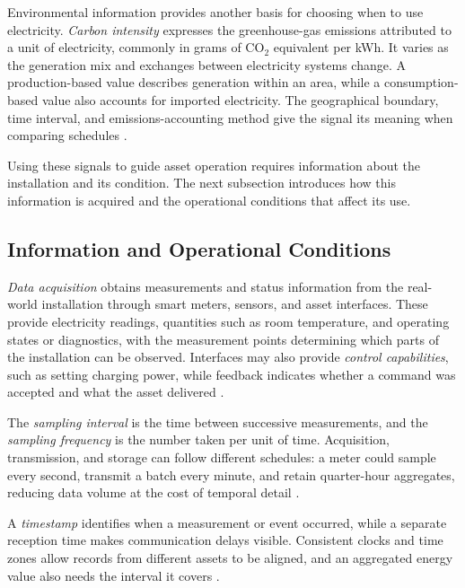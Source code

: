 Environmental information provides another basis for choosing when to use electricity. \emph{Carbon intensity} expresses the greenhouse-gas emissions attributed to a unit of electricity, commonly in grams of CO$_2$ equivalent per kWh. It varies as the generation mix and exchanges between electricity systems change. A production-based value describes generation within an area, while a consumption-based value also accounts for imported electricity. The geographical boundary, time interval, and emissions-accounting method give the signal its meaning when comparing schedules \parencite{electricitymapsmethodology,electricitymapscarbonintensity}.

Using these signals to guide asset operation requires information about the installation and its condition. The next subsection introduces how this information is acquired and the operational conditions that affect its use.


\subsection{Information and Operational Conditions}
\label{sec:ch2-energy-information}

\emph{Data acquisition} obtains measurements and status information from the real-world installation through smart meters, sensors, and asset interfaces. These provide electricity readings, quantities such as room temperature, and operating states or diagnostics, with the measurement points determining which parts of the installation can be observed. Interfaces may also provide \emph{control capabilities}, such as setting charging power, while feedback indicates whether a command was accepted and what the asset delivered \parencite{gopstein2021smartgrid}.

The \emph{sampling interval} is the time between successive measurements, and the \emph{sampling frequency} is the number taken per unit of time. Acquisition, transmission, and storage can follow different schedules: a meter could sample every second, transmit a batch every minute, and retain quarter-hour aggregates, reducing data volume at the cost of temporal detail \parencite{kelly2015ukdale}.

A \emph{timestamp} identifies when a measurement or event occurred, while a separate reception time makes communication delays visible. Consistent clocks and time zones allow records from different assets to be aligned, and an aggregated energy value also needs the interval it covers \parencite{stouffer2023otsecurity}.

